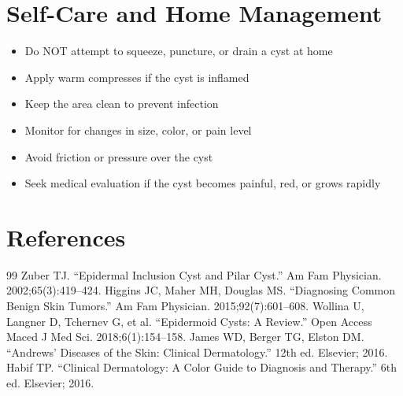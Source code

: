 \section*{Self-Care and Home Management}
\begin{itemize}
\item Do NOT attempt to squeeze, puncture, or drain a cyst at home
\item Apply warm compresses if the cyst is inflamed
\item Keep the area clean to prevent infection
\item Monitor for changes in size, color, or pain level
\item Avoid friction or pressure over the cyst
\item Seek medical evaluation if the cyst becomes painful, red, or grows rapidly
\end{itemize}

\section*{References}
\begin{thebibliography}{99}
 Zuber TJ. ``Epidermal Inclusion Cyst and Pilar Cyst.'' Am Fam Physician. 2002;65(3):419--424.
 Higgins JC, Maher MH, Douglas MS. ``Diagnosing Common Benign Skin Tumors.'' Am Fam Physician. 2015;92(7):601--608.
 Wollina U, Langner D, Tchernev G, et al. ``Epidermoid Cysts: A Review.'' Open Access Maced J Med Sci. 2018;6(1):154--158.
 James WD, Berger TG, Elston DM. ``Andrews' Diseases of the Skin: Clinical Dermatology.'' 12th ed. Elsevier; 2016.
 Habif TP. ``Clinical Dermatology: A Color Guide to Diagnosis and Therapy.'' 6th ed. Elsevier; 2016.
\end{thebibliography}
